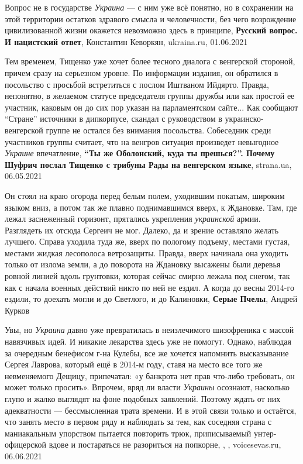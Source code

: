Вопрос не в государстве \emph{Украина} — с ним уже всё понятно, но в сохранении
на этой территории остатков здравого смысла и человечности, без чего
возрождение цивилизованной жизни окажется невозможно здесь в принципе,
\textbf{Русский вопрос. И нацистский ответ}, Константин Кеворкян, ukraina.ru, 01.06.2021

Тем временем, Тищенко уже хочет более тесного диалога с венгерской стороной,
причем сразу на серьезном уровне. По информации издания, он обратился в
посольство с просьбой встретиться с послом Иштваном Ийдярто. Правда, непонятно,
в желаемом статусе председателя группы дружбы или как простой ее участник,
каковым он до сих пор указан на парламентском сайте...  Как сообщают
\enquote{Стране} источники в дипкорпусе, скандал с руководством в
украинско-венгерской группе не остался без внимания посольства.  Собеседник
среди участников группы считает, что на венгров ситуация произведет невыгодное
\emph{Украине} впечатление,
\textbf{\enquote{Ты же Оболонский, куда ты прешься?}. Почему Шуфрич послал Тищенко с трибуны Рады на венгерском языке},
strana.ua, 06.05.2021

Он стоял на краю огорода перед белым полем, уходившим покатым, широким языком
вниз, а потом так же плавно поднимавшимся вверх, к Ждановке. Там, где лежал
заснеженный горизонт, прятались укрепления \emph{украинской} армии. Разглядеть
их отсюда Сергеич не мог. Далеко, да и зрение оставляло желать лучшего. Справа
уходила туда же, вверх по пологому подъему, местами густая, местами жидкая
лесополоса ветрозащиты. Правда, вверх начинала она уходить только от излома
земли, а до поворота на Ждановку высажены были деревья ровной линией вдоль
грунтовки, которая сейчас смирно лежала под снегом, так как с начала военных
действий никто по ней не ездил. А когда до весны 2014-го ездили, то доехать
могли и до Светлого, и до Калиновки,
\textbf{Серые Пчелы}, Андрей Курков

Увы, но \emph{Украина} давно уже превратилась в неизлечимого шизофреника с массой
навязчивых идей. И никакие лекарства здесь уже не помогут. Однако, наблюдая за
очередным бенефисом г-на Кулебы, все же хочется напомнить высказывание Сергея
Лаврова, который ещё в 2014-м году, ставя на место все того же невменяемого
Дещицу, припечатал: «у банкрота нет прав что-либо требовать, он может только
просить».  Впрочем, вряд ли власти \emph{Украины} осознают, насколько глупо и жалко
выглядят на фоне подобных заявлений. Поэтому ждать от них адекватности —
бессмысленная трата времени.  И в этой связи только и остаётся, что занять
место в первом ряду и наблюдать за тем, как соседняя страна с маниакальным
упорством пытается повторить трюк, приписываемый унтер-офицерской вдове и
постараться не разориться на попкорне,
, , voicesevas.ru, 06.06.2021

